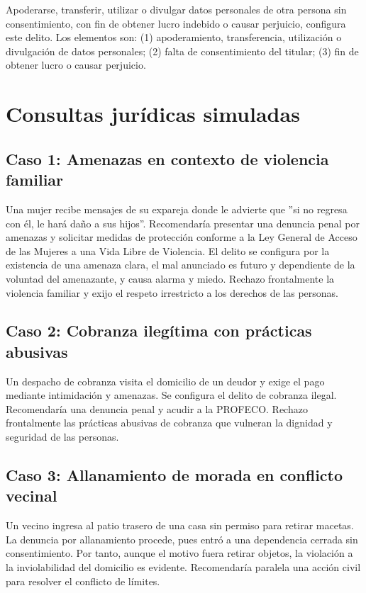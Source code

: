 \documentclass[12pt,spanish,letterpaper,oneside]{article}
\begin{document}
Apoderarse, transferir, utilizar o divulgar datos personales de otra persona sin consentimiento, con fin de obtener lucro indebido o causar perjuicio, configura este delito. Los elementos son: (1) apoderamiento, transferencia, utilización o divulgación de datos personales; (2) falta de consentimiento del titular; (3) fin de obtener lucro o causar perjuicio.

\section{Consultas jur\'idicas simuladas}

\subsection{Caso 1: Amenazas en contexto de violencia familiar}

Una mujer recibe mensajes de su expareja donde le advierte que ''si no regresa con \'el, le hará daño a sus hijos''. Recomendaría presentar una denuncia penal por amenazas y solicitar medidas de protección conforme a la Ley General de Acceso de las Mujeres a una Vida Libre de Violencia. El delito se configura por la existencia de una amenaza clara, el mal anunciado es futuro y dependiente de la voluntad del amenazante, y causa alarma y miedo. Rechazo frontalmente la violencia familiar y exijo el respeto irrestricto a los derechos de las personas.

\subsection{Caso 2: Cobranza ileg\'itima con pr\'acticas abusivas}

Un despacho de cobranza visita el domicilio de un deudor y exige el pago mediante intimidación y amenazas. Se configura el delito de cobranza ilegal. Recomendaría una denuncia penal y acudir a la PROFECO. Rechazo frontalmente las prácticas abusivas de cobranza que vulneran la dignidad y seguridad de las personas.

\subsection{Caso 3: Allanamiento de morada en conflicto vecinal}

Un vecino ingresa al patio trasero de una casa sin permiso para retirar macetas. La denuncia por allanamiento procede, pues entró a una dependencia cerrada sin consentimiento. Por tanto, aunque el motivo fuera retirar objetos, la violación a la inviolabilidad del domicilio es evidente. Recomendaría paralela una acción civil para resolver el conflicto de límites.
\end{document}
